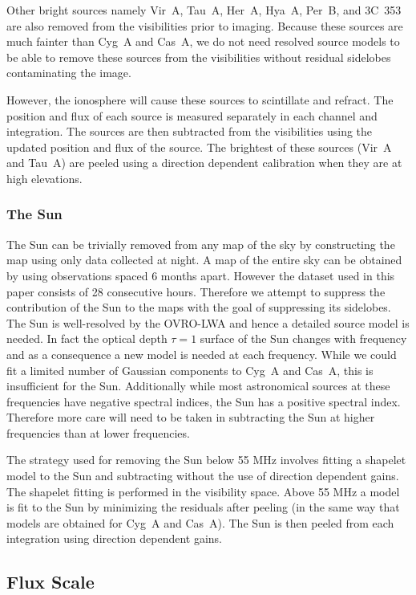\documentclass[twocolumn]{aastex61}
\begin{document}
Other bright sources namely Vir~A, Tau~A, Her~A, Hya~A, Per~B, and 3C~353 are also removed from
the visibilities prior to imaging. Because these sources are much fainter than Cyg~A and Cas~A, we
do not need resolved source models to be able to remove these sources from the visibilities without
residual sidelobes contaminating the image.

However, the ionosphere will cause these sources to scintillate and refract. The position and flux
of each source is measured separately in each channel and integration. The sources are then
subtracted from the visibilities using the updated position and flux of the source. The brightest of
these sources (Vir~A and Tau~A) are peeled using a direction dependent calibration when they are at
high elevations.

\subsubsection{The Sun}

The Sun can be trivially removed from any map of the sky by constructing the map using only data
collected at night. A map of the entire sky can be obtained by using observations spaced 6 months
apart.  However the dataset used in this paper consists of 28 consecutive hours. Therefore we
attempt to suppress the contribution of the Sun to the maps with the goal of suppressing its
sidelobes.  The Sun is well-resolved by the OVRO-LWA and hence a detailed source model is needed. In
fact the optical depth $\tau=1$ surface of the Sun changes with frequency and as a consequence a new
model is needed at each frequency. While we could fit a limited number of Gaussian components to
Cyg~A and Cas~A, this is insufficient for the Sun.  Additionally while most astronomical sources at
these frequencies have negative spectral indices, the Sun has a positive spectral index. Therefore
more care will need to be taken in subtracting the Sun at higher frequencies than at lower
frequencies.

The strategy used for removing the Sun below 55 MHz involves fitting a shapelet
\citep{2003MNRAS.338...35R} model to the Sun and subtracting without the use of direction dependent
gains. The shapelet fitting is performed in the visibility space. Above 55 MHz a model is fit to the
Sun by minimizing the residuals after peeling (in the same way that models are obtained for Cyg~A
and Cas~A). The Sun is then peeled from each integration using direction dependent gains.

\subsection{Flux Scale}
\end{document}
